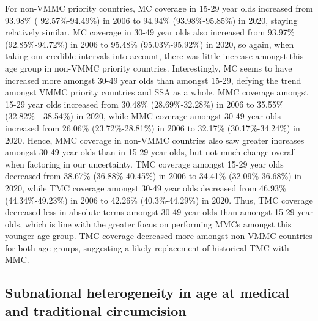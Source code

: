 \documentclass{article}
\begin{document}
For non-VMMC priority countries, MC coverage in 15-29 year olds increased from 93.98\% (
92.57\%-94.49\%) in 2006 to 94.94\% (93.98\%-95.85\%) in 2020, staying relatively similar. MC coverage in
30-49 year olds also increased from 93.97\% (92.85\%-94.72\%) in 2006 to 95.48\% (95.03\%-95.92\%) in 2020,
so again, when taking our credible intervals into account, there was little increase amongst this age group in
non-VMMC priority countries. Interestingly, MC seems to have increased more amongst 30-49 year
olds than amongst 15-29, defying the trend amongst VMMC priority countries and SSA as a whole. MMC
coverage amongst 15-29 year olds increased from 30.48\% (28.69\%-32.28\%) in 2006 to 35.55\% (32.82\% -
38.54\%) in 2020, while MMC coverage amongst 30-49 year olds increased from 26.06\% (23.72\%-28.81\%) in
2006 to 32.17\% (30.17\%-34.24\%) in 2020. Hence, MMC coverage in non-VMMC countries also saw greater
increases amongst 30-49 year olds than in 15-29 year olds, but not much change overall when factoring in our
uncertainty. TMC coverage amongst 15-29 year olds decreased from 38.67\% (36.88\%-40.45\%) in 2006 to
34.41\% (32.09\%-36.68\%) in 2020, while TMC coverage amongst 30-49 year olds decreased from 46.93\%
(44.34\%-49.23\%) in 2006 to 42.26\% (40.3\%-44.29\%) in 2020. Thus, TMC coverage decreased less in
absolute terms amongst 30-49 year olds than amongst 15-29 year olds, which is line with the greater focus on
performing MMCs amongst this younger age group. TMC coverage decreased more amongst non-VMMC
countries for both age groups, suggesting a likely replacement of historical TMC with MMC.

\subsection{Subnational heterogeneity in age at medical and traditional circumcision}
\end{document}
